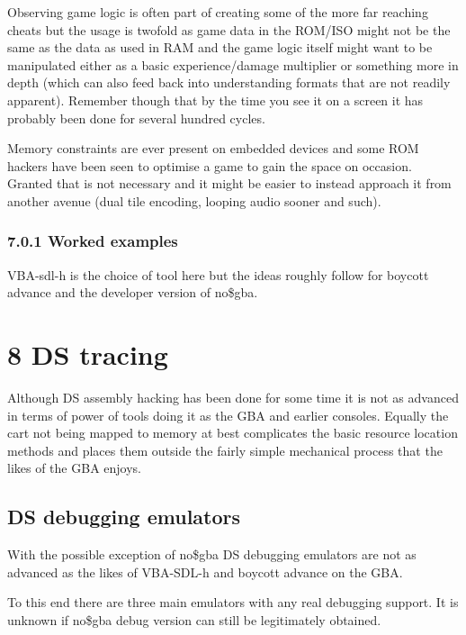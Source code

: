 \documentclass[
]{book}
\begin{document}
Observing game logic is often part of creating some of the more far reaching cheats but the usage is twofold as game data in the ROM/ISO might not be the same as the data as used in RAM and the game logic itself might want to be manipulated either as a basic experience/damage multiplier or something more in depth (which can also feed back into understanding formats that are not readily apparent). Remember though that by the time you see it on a screen it has probably been done for several hundred cycles.

Memory constraints are ever present on embedded devices and some ROM hackers have been seen to optimise a game to gain the space on occasion. Granted that is not necessary and it might be easier to instead approach it from another avenue (dual tile encoding, looping audio sooner and such).

\hypertarget{worked-examples}{%
\subsection{7.0.1 Worked examples}\label{worked-examples}}

VBA-sdl-h is the choice of tool here but the ideas roughly follow for boycott advance and the developer version of no\$gba.

\hypertarget{ds-tracing}{%
\chapter{8 DS tracing}\label{ds-tracing}}

Although DS assembly hacking has been done for some time it is not as advanced in terms of power of tools doing it as the GBA and earlier consoles. Equally the cart not being mapped to memory at best complicates the basic resource location methods and places them outside the fairly simple mechanical process that the likes of the GBA enjoys.

\hypertarget{ds-debugging-emulators}{%
\section{DS debugging emulators}\label{ds-debugging-emulators}}

With the possible exception of no\$gba DS debugging emulators are not as advanced as the likes of VBA-SDL-h and boycott advance on the GBA.

To this end there are three main emulators with any real debugging support. It is unknown if no\$gba debug version can still be legitimately obtained.
\end{document}
